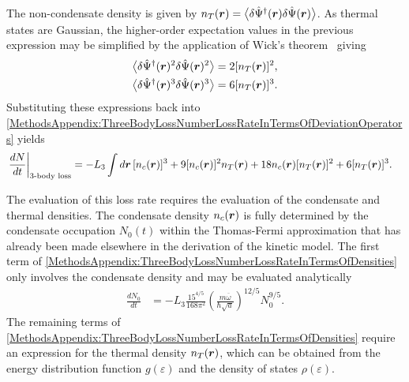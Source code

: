 The non-condensate density is given by $n_T(\bm{r}) = {\big<\delta\hat{\Psi}^\dagger(\bm{r}) \delta\hat{\Psi}(\bm{r})\big>}$.  As thermal states are Gaussian, the higher-order expectation values in the previous expression may be simplified by the application of Wick's theorem~\citep{Wick:1950} giving
\begin{align}
    {\ensuremath{\big<\delta\hat{\Psi}^\dagger(\bm{r})^2 \delta\hat{\Psi}(\bm{r})^2\big>}} &= 2 [n_T(\bm{r})]^2, \\
    {\big<\delta\hat{\Psi}^\dagger(\bm{r})^3 \delta\hat{\Psi}(\bm{r})^3\big>} &= 6 [n_T(\bm{r})]^3.
\end{align}
Substituting these expressions back into \eqref{MethodsAppendix:ThreeBodyLossNumberLossRateInTermsOfDeviationOperators} yields
\begin{align}
    \left.\frac{d N}{dt} \right|_\text{3-body loss} &=  -L_3 \int d \vect{r}\, [n_c(\vect{r})]^3 + 9 [n_c(\vect{r})]^2 n_T(\vect{r}) + 18 n_c(\vect{r}) [n_T(\vect{r})]^2 + 6 [n_T(\vect{r})]^3.
    \label{MethodsAppendix:ThreeBodyLossNumberLossRateInTermsOfDensities}
\end{align}

The evaluation of this loss rate requires the evaluation of the condensate and thermal densities.  The condensate density $n_c(\bm{r})$ is fully determined by the condensate occupation $N_0(t)$ within the Thomas-Fermi approximation that has already been made elsewhere in the derivation of the kinetic model.  The first term of \eqref{MethodsAppendix:ThreeBodyLossNumberLossRateInTermsOfDensities} only involves the condensate density and may be evaluated analytically
\begin{align}
    \frac{d N_0}{dt} &= - L_3 \frac{15^{4/5}}{168 \pi^2} \left(\frac{m \overline{\omega}}{\hbar \sqrt{a}} \right)^{12/5} N_0^{9/5}.
\end{align}
The remaining terms of \eqref{MethodsAppendix:ThreeBodyLossNumberLossRateInTermsOfDensities} require an expression for the thermal density $n_T(\bm{r})$, which can be obtained from the energy distribution function $g(\varepsilon)$ and the density of states $\rho(\varepsilon)$.

